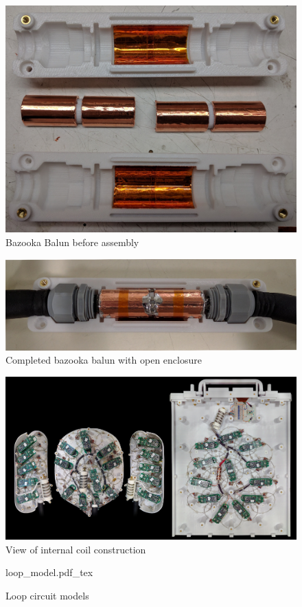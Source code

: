 \begin{figure}
\includegraphics[width=6in]{figures/bazooka_parts.jpg}
\caption{Bazooka Balun before assembly}
\label{fig:bazooka_parts}
\end{figure}

\begin{figure}
\includegraphics[width=6in]{figures/bazooka_assembled.jpg}
\caption{Completed bazooka balun with open enclosure}
\label{fig:bazooka_assembled}
\end{figure}
\clearpage
\newpage

\begin{figure}
\vspace{2.4in}
\includegraphics[width=6in]{figures/internals_composite.jpg}
\caption{View of internal coil construction}
\label{fig:internals_composite}
\end{figure}
\clearpage
\newpage

\begin{figure}
\vspace{2.4in}
{loop_model.pdf_tex}
\caption{Loop circuit models}
\label{fig:loop_model}
\end{figure}
\clearpage
\newpage
